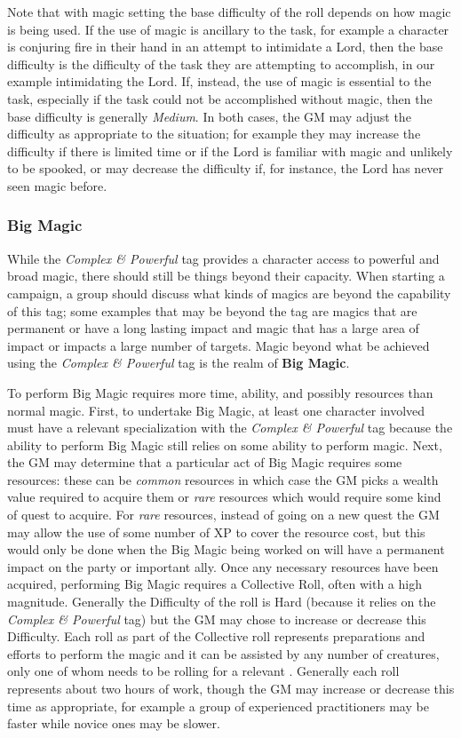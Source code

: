 Note that with magic setting the base difficulty of the roll depends on how magic is being used.
If the use of magic is ancillary to the task, for example a character is conjuring fire in their hand in an attempt to intimidate a Lord, then the base difficulty is the difficulty of the task they are attempting to accomplish, in our example intimidating the Lord.
If, instead, the use of magic is essential to the task, especially if the task could not be accomplished without magic, then the base difficulty is generally \emph{Medium}.
In both cases, the GM may adjust the difficulty as appropriate to the situation; for example they may increase the difficulty if there is limited time or if the Lord is familiar with magic and unlikely to be spooked, or may decrease the difficulty if, for instance, the Lord has never seen magic before.

\subsubsection{Big Magic}\label{sec:big-magic}
While the \emph{Complex \& Powerful} tag provides a character access to powerful and broad magic, there should still be things beyond their capacity.
When starting a campaign, a group should discuss what kinds of magics are beyond the capability of this tag; some examples that may be beyond the tag are magics that are permanent or have a long lasting impact and magic that has a large area of impact or impacts a large number of targets.
Magic beyond what be achieved using the \emph{Complex \& Powerful} tag is the realm of \textbf{Big Magic}.

To perform Big Magic requires more time, ability, and possibly resources than normal magic.
First, to undertake Big Magic, at least one character involved must have a relevant specialization with the \emph{Complex \& Powerful} tag because the ability to perform Big Magic still relies on some ability to perform magic.
Next, the GM may determine that a particular act of Big Magic requires some resources: these can be \emph{common} resources in which case the GM picks a wealth value required to acquire them or \emph{rare} resources which would require some kind of quest to acquire.
For \emph{rare} resources, instead of going on a new quest the GM may allow the use of some number of XP to cover the resource cost, but this would only be done when the Big Magic being worked on will have a permanent impact on the party or important ally.
Once any necessary resources have been acquired, performing Big Magic requires a Collective Roll, often with a high magnitude.
Generally the Difficulty of the roll is Hard (because it relies on the \emph{Complex \& Powerful} tag) but the GM may chose to increase or decrease this Difficulty.
Each roll as part of the Collective roll represents preparations and efforts to perform the magic and it can be assisted by any number of creatures, only one of whom needs to be rolling for a relevant \Specialization{}.
Generally each roll represents about two hours of work, though the GM may increase or decrease this time as appropriate, for example a group of experienced practitioners may be faster while novice ones may be slower.

